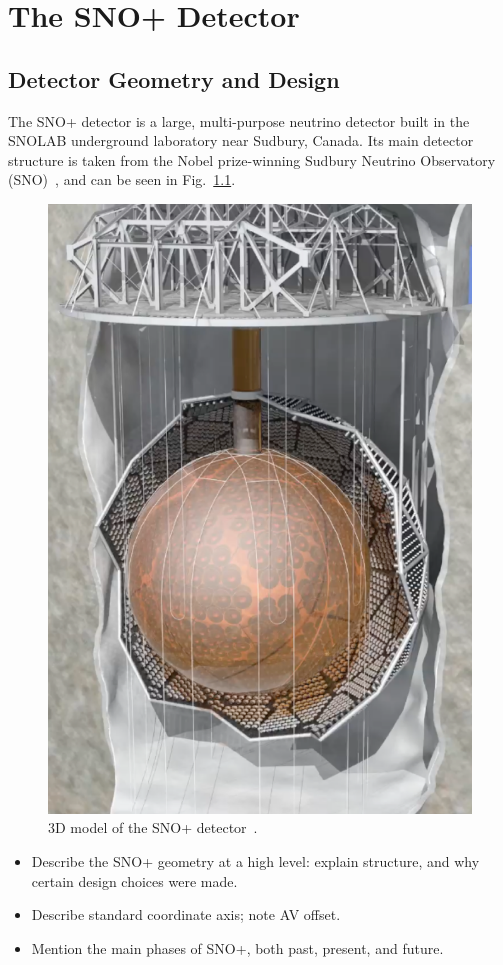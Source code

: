 
\chapter{The SNO+ Detector}\label{chap:detector}
\section{Detector Geometry and Design}
The SNO+ detector is a large, multi-purpose neutrino detector built in the SNOLAB underground laboratory near Sudbury, Canada. Its main detector structure is taken from the Nobel prize-winning Sudbury Neutrino Observatory (SNO)~\cite{}, %
and can be seen in Fig.~\ref{fig:snoplus_detector}.

\begin{figure}
    \centering
    \includegraphics[width=0.48\linewidth]{2_Detector/Figs/detector_picture.png}
    \caption[3D model of the SNO+ detector]{3D model of the SNO+ detector~\cite{albanese_sno_2021}.}
    \label{fig:snoplus_detector}
\end{figure}


\begin{itemize}
    \item Describe the SNO+ geometry at a high level: explain structure, and why certain design choices were made.
    \item Describe standard coordinate axis; note AV offset.
    \item Mention the main phases of SNO+, both past, present, and future.
\end{itemize}
